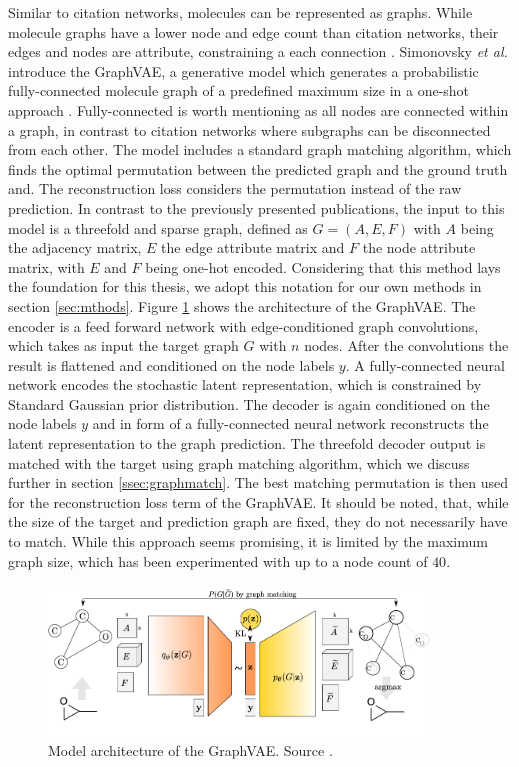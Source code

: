 Similar to citation networks, molecules can be represented as graphs. While molecule graphs have a lower node and edge count than citation networks, their edges and nodes are attribute, constraining a each connection .
Simonovsky \textit{et al.} introduce the GraphVAE, a generative model which generates a probabilistic fully-connected molecule graph of a predefined maximum size
in a one-shot approach \cite{simonovsky_graphvae_2018}. Fully-connected is worth mentioning as all nodes are connected within a graph, in contrast to citation networks where subgraphs can be disconnected from each other. The model includes a standard graph matching algorithm, which finds the optimal permutation between the predicted graph and the ground truth and. The reconstruction loss considers the permutation instead of the raw prediction. In contrast to the previously presented publications, the input to this model is a threefold and sparse graph, defined as $G=(A, E, F)$ with $A$ being the adjacency matrix, $E$ the edge attribute matrix and $F$ the node attribute matrix, with $E$ and $F$ being one-hot encoded. Considering that this method lays the foundation for this thesis, we adopt this notation for our own methods in section \ref{sec:mthods}. Figure \ref{fig:graphvaefull} shows the architecture of the GraphVAE. The encoder is a feed forward network with edge-conditioned graph convolutions, which takes as input the target graph $G$ with $n$ nodes. After the convolutions the result is flattened and conditioned on the node labels $y$. A fully-connected neural network encodes the stochastic latent representation, which is constrained by Standard Gaussian prior distribution. The decoder is again conditioned on the node labels $y$ and in form of a fully-connected neural network reconstructs the latent representation to the graph prediction. The threefold decoder output is matched with the target using graph matching algorithm, which we discuss further in section \ref{ssec:graphmatch}. The best matching permutation is then used for the reconstruction loss term of the GraphVAE. It should be noted, that, while the size of the target and prediction graph are fixed, they do not necessarily have to match. While this approach seems promising, it is limited by the maximum graph size, which has been experimented with up to a node count of $40$.


\begin{figure}[h]
    \centering
    \includegraphics[width=0.9\textwidth]{data/images/GraphVAEfull.png}
    \caption{Model architecture of the GraphVAE. Source \cite{simonovsky_graphvae_2018}.}
    \label{fig:graphvaefull}
\end{figure}

